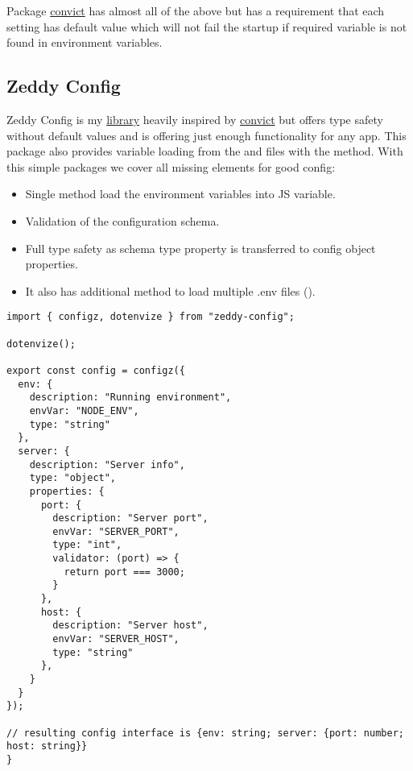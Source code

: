     Package \href{https://www.npmjs.com/package/convict}{convict} has almost all
    of the above but has a requirement that each setting has default value
    which will not fail the startup if required variable is not found in
    environment variables.

    \subsection{Zeddy Config}\label{subsec:zeddy-config}
    Zeddy Config is my \href{https://www.npmjs.com/package/zeddy-config}{library}
    heavily inspired by \href{https://www.npmjs.com/package/convict}{convict} but offers
    type safety without default values and is offering just enough functionality
    for any app.
    This package also provides variable loading from the 
    and  files with the  method.
    With this simple
    packages we cover all missing elements for good config:
    \begin{itemize}
        \item Single method load the environment variables into JS variable.
        \item Validation of the configuration schema.
        \item Full type safety as schema type property is transferred to config object properties.
        \item It also has additional method to load multiple .env files ().
    \end{itemize}

    \begin{verbatim}
import { configz, dotenvize } from "zeddy-config";

dotenvize();

export const config = configz({
  env: {
    description: "Running environment",
    envVar: "NODE_ENV",
    type: "string"
  },
  server: {
    description: "Server info",
    type: "object",
    properties: {
      port: {
        description: "Server port",
        envVar: "SERVER_PORT",
        type: "int",
        validator: (port) => {
          return port === 3000;
        }
      },
      host: {
        description: "Server host",
        envVar: "SERVER_HOST",
        type: "string"
      },
    }
  }
});

// resulting config interface is {env: string; server: {port: number; host: string}}
}
    \end{verbatim}


